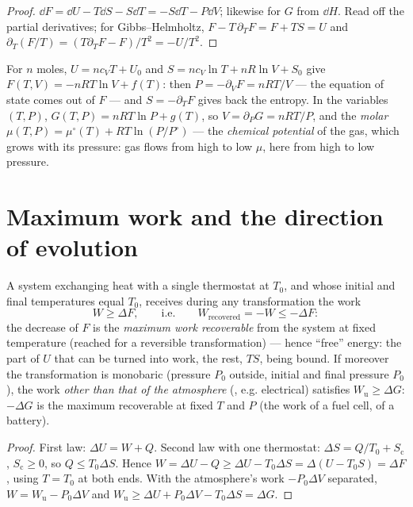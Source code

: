 \begin{proof}
$\dd F = \dd U - T\dd S - S\dd T = -S\dd T - P\dd V$; likewise for $G$
from $\dd H$. Read off the partial derivatives; for Gibbs--Helmholtz,
$F - T\,\partial_TF = F + TS = U$ and $\partial_T(F/T) = (T\partial_TF -
F)/T^2 = -U/T^2$.
\end{proof}

\begin{example}\label{ex:b2:thermodynamic-potentials:perfect}
For $n$ moles, $U = nc_{V}T + U_0$ and $S = nc_V\ln T + nR\ln V + S_0$
give $F(T,V) = -nRT\ln V + f(T)$: then $P = -\partial_VF = nRT/V$
--- the equation of state comes out of $F$ --- and $S = -\partial_TF$
gives back the entropy. In the variables $(T,P)$, $G(T,P) = nRT\ln P +
g(T)$, so $V = \partial_PG = nRT/P$, and the \emph{molar} 
$\mu(T,P) = \mu^\circ(T) + RT\ln(P/P^\circ)$ --- the \emph{chemical
potential} of the gas, which grows with its
pressure: gas flows from high to low $\mu$, here from high to low
pressure.
\end{example}

\section{Maximum work and the direction of evolution}

\begin{theorem}\label{thm:b2:thermodynamic-potentials:monothermal}
A system exchanging heat with a single thermostat at $T_0$, and whose
initial and final temperatures equal $T_0$, receives during any
transformation the work
\[
W \ge \Delta F , \qquad\text{i.e.}\qquad W_{\text{recovered}} = -W \le -\Delta F :
\]
the decrease of $F$ is the \emph{maximum work recoverable} from the
system at fixed temperature (reached for a reversible transformation) ---
hence ``free'' energy: the part of $U$ that can be turned into work, the
rest, $TS$, being bound. If moreover the transformation is monobaric
(pressure $P_0$ outside, initial and final pressure $P_0$), the work
\emph{other than that of the atmosphere} (, e.g. electrical)
satisfies $W_{\text{u}} \ge \Delta G$: $-\Delta G$ is the maximum 
recoverable at fixed $T$ and $P$ (the work of a fuel cell, of a
battery).
\end{theorem}

\begin{proof}
First law: $\Delta U = W + Q$. Second law with one thermostat: $\Delta S
= Q/T_0 + S_{\text{c}}$, $S_{\text{c}} \ge 0$, so $Q \le T_0\Delta S$. Hence
$W = \Delta U - Q \ge \Delta U - T_0\Delta S = \Delta(U - T_0S) = \Delta F$, using
$T = T_0$ at both ends. With the atmosphere's work $-P_0\Delta V$
separated, $W = W_{\text{u}} - P_0\Delta V$ and $W_{\text{u}} \ge \Delta U + P_0
\Delta V - T_0\Delta S = \Delta G$.
\end{proof}

